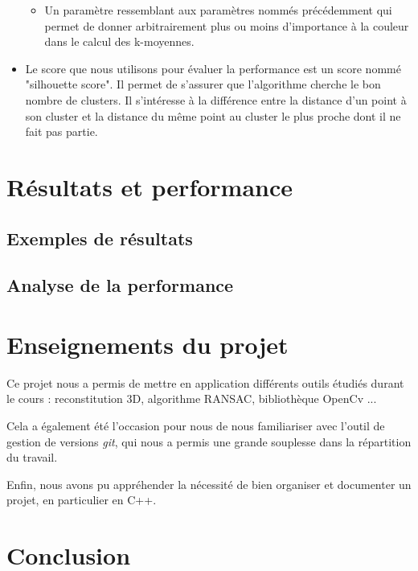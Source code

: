 \documentclass[titlepage,11pt,a4paper]{article}
\begin{document}
\begin{itemize}
{\begin{itemize}
\item{Un paramètre ressemblant aux paramètres nommés précédemment qui permet de donner arbitrairement plus ou moins d'importance à la couleur dans le calcul des k-moyennes.}
\end{itemize}}
\item{Le score que nous utilisons pour évaluer la performance est un score nommé "silhouette score". Il permet de s'assurer que l'algorithme cherche le bon nombre de clusters. Il s'intéresse à la différence entre la distance d'un point à son cluster et la distance du même point au cluster le plus proche dont il ne fait pas partie.}
\end{itemize}

\newpage \section{Résultats et performance}
\subsection{Exemples de résultats}
\subsection{Analyse de la performance}



\newpage \section{Enseignements du projet}
\par Ce projet nous a permis de mettre en application différents outils étudiés durant le cours : reconstitution 3D, algorithme RANSAC, bibliothèque OpenCv ...
\par Cela a également été l'occasion pour nous de nous familiariser avec l'outil de gestion de versions \emph{git}, qui nous a permis une grande souplesse dans la répartition du travail.
\par Enfin, nous avons pu appréhender la nécessité de bien organiser et documenter un projet, en particulier en C++.


\newpage \section{Conclusion}
\end{document}
